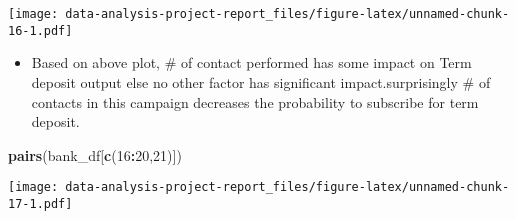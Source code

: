 \documentclass[
]{article}
\newenvironment{Shaded}{\begin{snugshade}}{\end{snugshade}}
\newcommand{\DecValTok}[1]{\textcolor[rgb]{0.00,0.00,0.81}{#1}}
\newcommand{\KeywordTok}[1]{\textcolor[rgb]{0.13,0.29,0.53}{\textbf{#1}}}
\newcommand{\NormalTok}[1]{#1}
\newcommand{\OperatorTok}[1]{\textcolor[rgb]{0.81,0.36,0.00}{\textbf{#1}}}
\providecommand{\tightlist}{%
  \setlength{\itemsep}{0pt}\setlength{\parskip}{0pt}}
\begin{document}
\texttt{[image: data-analysis-project-report\_files/figure-latex/unnamed-chunk-16-1.pdf]}

\begin{itemize}
\tightlist
\item
  Based on above plot, \# of contact performed has some impact on Term
  deposit output else no other factor has significant
  impact.surprisingly \# of contacts in this campaign decreases the
  probability to subscribe for term deposit.
\end{itemize}

\begin{Shaded}
\begin{Highlighting}[]
\KeywordTok{pairs}\NormalTok{(bank_df[}\KeywordTok{c}\NormalTok{(}\DecValTok{16}\OperatorTok{:}\DecValTok{20}\NormalTok{,}\DecValTok{21}\NormalTok{)])}
\end{Highlighting}
\end{Shaded}

\texttt{[image: data-analysis-project-report\_files/figure-latex/unnamed-chunk-17-1.pdf]}
\end{document}
